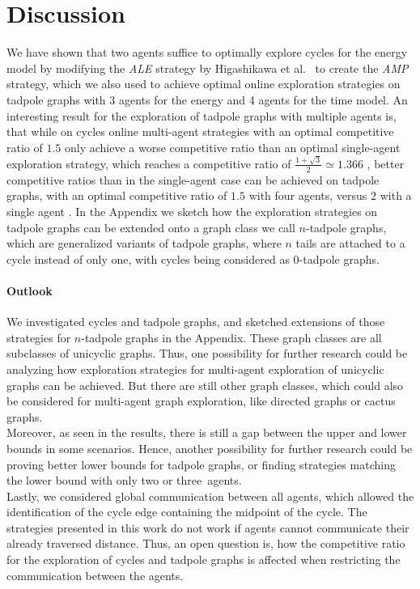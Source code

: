 \section{Discussion} \label{discussion}

We have shown that two agents suffice to optimally explore cycles for the energy model by modifying the \textit{ALE} strategy by Higashikawa et al.\ \cite{Higashikawa2012}
to create the \textit{AMP} strategy, which we also used to achieve optimal online exploration strategies on tadpole graphs with 3 agents for the energy and 4 agents for the time model.
An interesting result for the exploration of tadpole graphs with multiple agents is, that while on cycles online multi-agent strategies with an optimal competitive ratio of $1.5$ 
only achieve a worse competitive ratio than an optimal single-agent exploration strategy,
which reaches a competitive ratio of $\frac{1 + \sqrt{3}}{2} \simeq 1.366$ \cite{MIYAZAKI2009}, better competitive ratios
than in the single-agent case can be achieved on tadpole graphs, with an optimal competitive ratio of $1.5$ with four agents, versus $2$ with a single agent \cite{Brandt2020}. 
In the Appendix we sketch how the exploration strategies on tadpole graphs can be extended onto a graph class we call $n$-tadpole graphs, which are generalized variants of tadpole graphs, where $n$ tails are attached to a cycle instead of only one, with cycles being considered as $0$-tadpole graphs.

\paragraph*{Outlook}
We investigated cycles and tadpole graphs, and sketched extensions of those strategies for $n$-tadpole graphs
in the Appendix. 
These graph classes are all subclasses of unicyclic graphs.
Thus, one possibility for further research could be analyzing how exploration strategies for multi-agent exploration of unicyclic graphs can be achieved. But there are still other graph classes, which could also be considered for multi-agent graph exploration,
like directed graphs or cactus graphs.\\
Moreover, as seen in the results, there is still a gap between the upper and lower bounds in some scenarios.
Hence, another possibility for further research could be proving better lower bounds for tadpole graphs, or finding strategies matching the lower bound with only two or three~agents.\\
Lastly, we considered global communication between all agents, which allowed the identification
of the cycle edge containing the midpoint of the cycle. The strategies presented in this work do
not work if agents cannot communicate their already traversed distance. Thus, an open question is, how the competitive
ratio for the exploration of cycles and tadpole graphs is affected when restricting the communication between the agents.